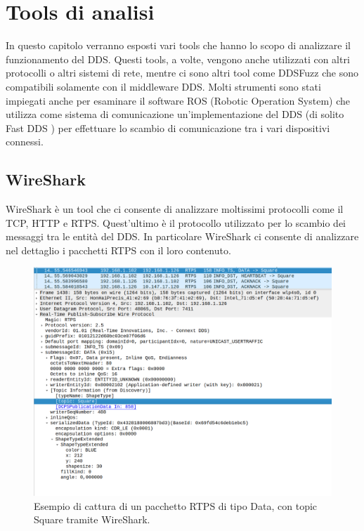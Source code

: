 \chapter{Tools di analisi}
In questo capitolo verranno esposti vari tools che hanno lo 
scopo di analizzare il funzionamento del DDS. Questi tools,
a volte,
vengono anche utilizzati con altri protocolli o 
altri sistemi di rete, mentre ci sono altri tool come DDSFuzz 
che sono compatibili solamente con il middleware DDS. Molti 
strumenti sono stati impiegati anche per esaminare il 
software ROS (Robotic Operation System) che utilizza come 
sistema di comunicazione un'implementazione del DDS 
(di solito Fast DDS \cite{FastDDS}) per effettuare lo scambio 
di comunicazione tra i vari dispositivi connessi.


\section{WireShark}
WireShark è un tool che ci consente di analizzare moltissimi protocolli 
come il TCP, HTTP e RTPS. Quest'ultimo è il protocollo utilizzato  
per lo scambio dei messaggi tra le entità del DDS. In particolare WireShark
ci consente di analizzare nel dettaglio i pacchetti RTPS con il loro 
contenuto.

\begin{figure}[H]
    \centering
    \includegraphics[width=15.2cm, keepaspectratio]{img/wiresharkexampleshapes.png}
    \caption{Esempio di cattura di un pacchetto RTPS di tipo Data, con topic
    Square tramite WireShark.}
    \label{wireskartshapesdemo}
\end{figure}


